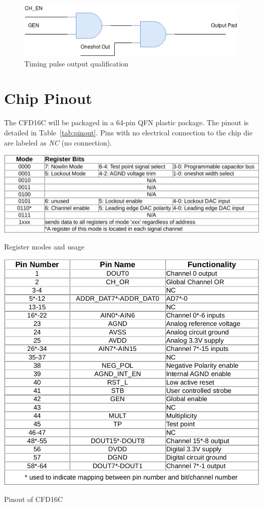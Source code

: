 \documentclass[12pt,oneside,final]{siuethesis}
\theoremstyle{definition}
\begin{document}
\begin{figure}[h!]
\centering
\includegraphics[scale=.7,keepaspectratio=true]{./ch2_figures/output.png} 
\caption{Timing pulse output qualification}
\label{fig:output-qual}
\end{figure}
\section{Chip Pinout}
\par The CFD16C will be packaged in a 64-pin QFN plastic package. The pinout is detailed in Table~\ref{tab:pinout}. Pins with no electrical connection to the chip die are labeled as \emph{NC} (no connection).

\begin{table}[htbp!]
\centering
\includegraphics[scale=.35,keepaspectratio=true]{../data/modes.png} 
\caption{Register modes and usage}
\label{tab:modes}
\end{table}

\begin{table}[htbp!]
 \centering
 \includegraphics[scale=.35,keepaspectratio=true]{./ch2_figures/pinout.png}
 \caption{Pinout of CFD16C}
 \label{tab:pinout}
\end{table}
\end{document}
